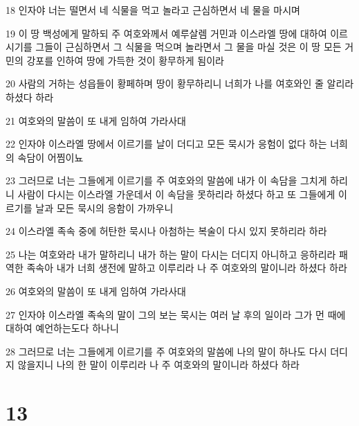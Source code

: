 \par 18 인자야 너는 떨면서 네 식물을 먹고 놀라고 근심하면서 네 물을 마시며
\par 19 이 땅 백성에게 말하되 주 여호와께서 예루살렘 거민과 이스라엘 땅에 대하여 이르시기를 그들이 근심하면서 그 식물을 먹으며 놀라면서 그 물을 마실 것은 이 땅 모든 거민의 강포를 인하여 땅에 가득한 것이 황무하게 됨이라
\par 20 사람의 거하는 성읍들이 황페하며 땅이 황무하리니 너희가 나를 여호와인 줄 알리라 하셨다 하라
\par 21 여호와의 말씀이 또 내게 임하여 가라사대
\par 22 인자야 이스라엘 땅에서 이르기를 날이 더디고 모든 묵시가 응험이 없다 하는 너희의 속담이 어찜이뇨
\par 23 그러므로 너는 그들에게 이르기를 주 여호와의 말씀에 내가 이 속담을 그치게 하리니 사람이 다시는 이스라엘 가운데서 이 속담을 못하리라 하셨다 하고 또 그들에게 이르기를 날과 모든 묵시의 응함이 가까우니
\par 24 이스라엘 족속 중에 허탄한 묵시나 아첨하는 복술이 다시 있지 못하리라 하라
\par 25 나는 여호와라 내가 말하리니 내가 하는 말이 다시는 더디지 아니하고 응하리라 패역한 족속아 내가 너희 생전에 말하고 이루리라 나 주 여호와의 말이니라 하셨다 하라
\par 26 여호와의 말씀이 또 내게 임하여 가라사대
\par 27 인자야 이스라엘 족속의 말이 그의 보는 묵시는 여러 날 후의 일이라 그가 먼 때에 대하여 예언하는도다 하나니
\par 28 그러므로 너는 그들에게 이르기를 주 여호와의 말씀에 나의 말이 하나도 다시 더디지 않을지니 나의 한 말이 이루리라 나 주 여호와의 말이니라 하셨다 하라

\chapter{13}

